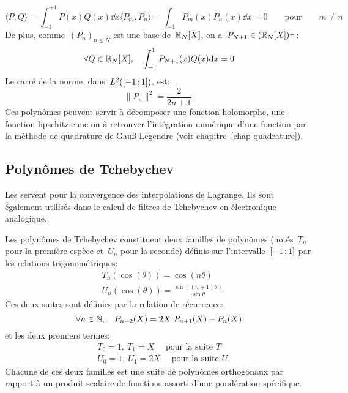 \begin{equation}
\langle P,Q\rangle= \int_{-1}^{+1} P(x) Q(x)\dd x \langle P_m,P_n\rangle= \int_{-1}^{1} P_m(x)P_n(x)\dd x = 0\qquad \mathrm{pour}\qquad m \ne n 
\end{equation}
De plus, comme~$(P_n)_{n\leq N}$ est une base de~$\mathbb R_N[X]$, on a~$P_{N+1} \in (\mathbb R_N[X])^\bot$: 
\begin{equation}
\forall Q \in \mathbb R_N[X],\quad \int_{-1}^{1} P_{N+1}(x)Q(x)\text{d} x = 0 
\end{equation}
Le carré de la norme, dans~$L^2(\mathopen{[}-1\,;1\mathclose{]})$, est: 
\begin{equation}
 \|P_n\|^2=\frac{2}{2n+1}. 
\end{equation}
Ces polynômes peuvent servir à décomposer une fonction holomorphe, une fonction lipschitzienne ou à retrouver l'intégration numérique d'une fonction par la méthode de quadrature de Gauß-Legendre (voir chapitre~\ref{chap-quadrature}). 

\medskip
\subsection{Polynômes de Tchebychev} 


Les  servent pour la convergence des interpolations de Lagrange. Ils sont également utilisés dans le calcul de filtres de Tchebychev en électronique analogique. 

Les polynômes de Tchebychev constituent deux familles de polynômes (notés~$T_n$ pour la première espèce et~$U_n$ pour la seconde) définis sur l'intervalle~$\mathopen{[}-1\,;1\mathclose{]}$ par les relations trigonométriques: 
\begin{align}
&T_n(\cos(\theta))=\cos(n\theta)\\
&U_n(\cos(\theta))=\frac{\sin((n+1) \theta)}{\sin \theta} 
\end{align}
Ces deux suites sont définies par la relation de récurrence: 
\begin{equation}
\forall n\in\mathbb N,\quad P_{n+2}(X)=2X~P_{n+1}(X)-P_n(X) 
\end{equation}
et les deux premiers termes: 
\begin{align}
&T_0=1,~T_1=X \quad \text{ pour la suite } T\\
&U_0=1,~U_1=2X \quad \text{ pour la suite } U 
\end{align}
Chacune de ces deux familles est une suite de polynômes orthogonaux par rapport à un produit scalaire de fonctions assorti d'une pondération spécifique. 
